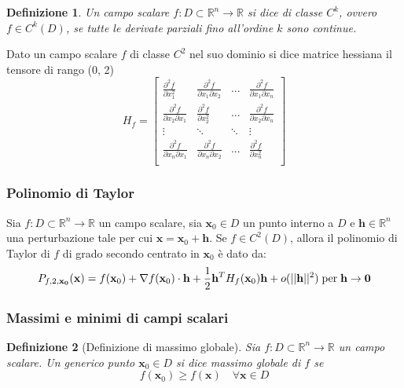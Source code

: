 \documentclass{article}
\newtheorem{definition}{Definizione}
\newcommand{\mfrac}[2]{\displaystyle\frac{#1}{#2}}
\begin{document}
            \begin{definition}
                Un campo scalare $f: D \subset \mathbb{R}^{n} \rightarrow \mathbb{R}$ si dice di classe $C^{k}$, ovvero $f \in C^{k}(D)$, se tutte le derivate parziali fino all'ordine $k$ sono continue.
            \end{definition}

            Dato un campo scalare $f$ di classe $C^{2}$ nel suo dominio si dice matrice hessiana il tensore di rango (0, 2)
            \[
                H_{f} = 
                \begin{bmatrix}
                    \mfrac{\partial^{2} f}{\partial x_1^{2}} & \mfrac{\partial^{2} f}{\partial x_1 \partial x_2} & ... & \mfrac{\partial^{2} f}{\partial x_1 \partial x_n} \\
                    \mfrac{\partial^{2} f}{\partial x_2 \partial x_1} & \mfrac{\partial^{2} f}{\partial x_2^{2}} & ... & \mfrac{\partial^{2} f}{\partial x_2 \partial x_n} \\
                    \vdots & \ddots & \ddots & \vdots \\
                    \mfrac{\partial^{2} f}{\partial x_n \partial x_1} & \mfrac{\partial^{2} f}{\partial x_n \partial x_2} & ... & \mfrac{\partial^{2} f}{\partial x_n^{2}} \\
                \end{bmatrix} 
            \]
            
        \subsubsection{Polinomio di Taylor}
            Sia $f: D \subset \mathbb{R}^{n} \rightarrow \mathbb{R}$ un campo scalare, sia $\mathbf{x}_0 \in D$ un punto interno a $D$ e $\mathbf{h} \in \mathbb{R}^{n}$ una perturbazione 
            tale per cui $\mathbf{x} = \mathbf{x}_0 + \mathbf{h}$. Se $f \in C^{2}(D)$, allora il polinomio di Taylor di $f$ di grado secondo centrato in $\mathbf{x}_0$ è dato da:
            \[
                P_{f, 2, \mathbf{x_0}} (\mathbf{x}) = f(\mathbf{x}_0) + \nabla f(\mathbf{x}_0) \cdot \mathbf{h} + \frac{1}{2} \mathbf{h}^{T} H_{f}(\mathbf{x}_0) \mathbf{h} + o(||\mathbf{h}||^{2}) \; \textnormal{per} \; \mathbf{h} \rightarrow \mathbf{0}
            \]
    
        \subsubsection{Massimi e minimi di campi scalari}
            \begin{definition}[Definizione di massimo globale]
                Sia $f: D \subset \mathbb{R}^{n} \rightarrow \mathbb{R}$ un campo scalare. Un generico punto $\mathbf{x}_0 \in D$ si dice massimo globale di $f$ se 
                \[
                    f(\mathbf{x}_0) \geq f(\mathbf{x}) \quad \forall \mathbf{x} \in D
                \]
            \end{definition}
\end{document}
